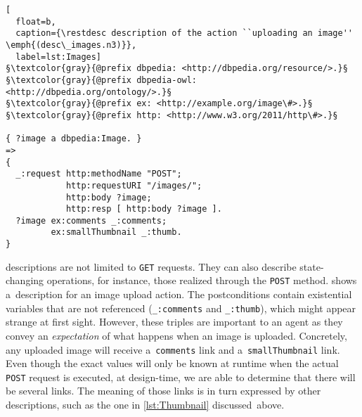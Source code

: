 \begin{lstlisting}[
  float=b,
  caption={\restdesc description of the action ``uploading an image'' \emph{(desc\_images.n3)}},
  label=lst:Images]
§\textcolor{gray}{@prefix dbpedia: <http://dbpedia.org/resource/>.}§
§\textcolor{gray}{@prefix dbpedia-owl: <http://dbpedia.org/ontology/>.}§
§\textcolor{gray}{@prefix ex: <http://example.org/image\#>.}§
§\textcolor{gray}{@prefix http: <http://www.w3.org/2011/http\#>.}§

{ ?image a dbpedia:Image. }
=>
{
  _:request http:methodName "POST";
            http:requestURI "/images/";
            http:body ?image;
            http:resp [ http:body ?image ].
  ?image ex:comments _:comments;
         ex:smallThumbnail _:thumb.
}
\end{lstlisting}

\restdesc descriptions are not limited to \verb!GET! requests.
They can also describe state-changing operations,
for instance, those realized through the \verb!POST! method.
 shows a~description for an image upload action.
The postconditions contain existential variables that are not referenced
(\verb!_:comments! and \verb!_:thumb!),
which might appear strange at first sight.
However, these triples are important to an agent
as they convey an \emph{expectation} of what happens when an image is uploaded.
Concretely, any uploaded image will receive a~\verb!comments! link
and a~\verb!smallThumbnail! link.
Even though the exact values will only be known at runtime
when the actual \verb!POST! request is executed,
at design-time, we are able to determine that there will be several links.
The meaning of those links is in turn expressed by other descriptions,
such as the one in \cref{lst:Thumbnail} discussed~above.
